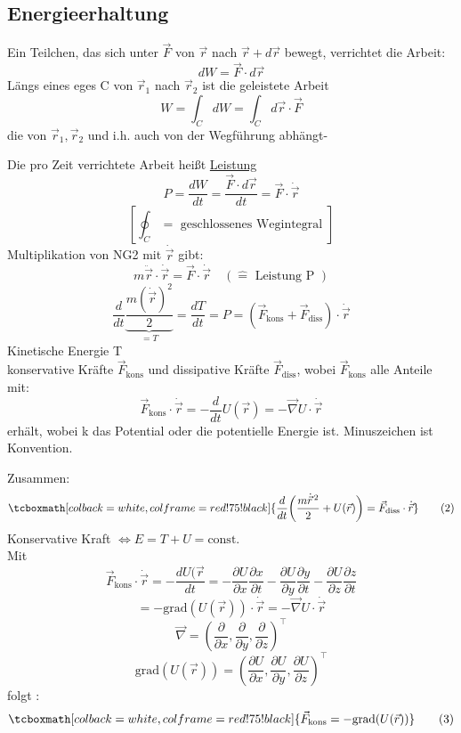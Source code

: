 \documentclass[titlepage,12pt,a4paper,ngerman]{report}
\newcommand{\tx}[1]{\textrm{#1}}
\newcommand{\ub}[1]{\underbrace{#1}}
\newcommand{\grad}{\tx{grad}}
\newcommand{\rmbox}[1]{\tcboxmath[colback=white,colframe=red!75!black]{#1}} %
\renewcommand{\boxed}{\rmbox}
\begin{document}
{\subsection{Energieerhaltung}
Ein Teilchen, das sich unter $\vec{F}$ von $\vec{r}$ nach $\vec{r} + d\vec{r}$ bewegt, verrichtet die Arbeit:
$$ dW = \vec{F} \cdot d \vec{r}$$
Längs eines eges C von $\vec{r}_{1}$ nach $\vec{r}_{2}$ ist die geleistete Arbeit
$$W = \int_C dW = \int_C d\vec{r}\cdot \vec{F}$$
die von $\vec{r}_1, \vec{r}_2$ und i.h. auch von der Wegführung abhängt-\par
Die pro Zeit verrichtete Arbeit heißt \underline{Leistung} 
$$ P = \frac{dW}{dt} = \frac{\vec{F}\cdot d \vec{r}}{dt} = \vec{F}\cdot \dot{\vec{r}}$$
$$[\oint_C = \textrm{ geschlossenes Wegintegral }]$$
Multiplikation von NG2 mit $\dot{\vec{r}}$ gibt:
$$ m\ddot{\vec{r}} \cdot \dot{\vec{r}} =\vec{F} \cdot \dot{\vec{r}} \quad ( \widehat{=} \tx{ Leistung P })$$
$$\frac{d}{dt} \ub{\frac{m(\dot{\vec{r}})^2}{2}}_{=T} = \frac{dT}{dt} = P = (\vec{F}_{\tx{kons}} + \vec{F}_{\tx{diss}}) \cdot \dot{\vec{r}} $$
Kinetische Energie T\\
konservative Kräfte $\vec{F}_{\tx{kons}}$ und dissipative Kräfte $\vec{F}_{\tx{diss}}$, wobei $\vec{F}_{\tx{kons}}$ alle Anteile mit:
$$\vec{F}_{\tx{kons}} \cdot \dot{\vec{r}} = - \frac{d}{dt} U(\vec{r}) = - \vec{\nabla} U \cdot \dot{\vec{r}}$$
erhält, wobei k das Potential oder die potentielle Energie ist.
Minuszeichen ist Konvention.\par
Zusammen:
\begin{equation*}
\boxed{\frac{d}{dt} \bigg( \frac{m \dot{\vec{r}}^{\,2}}{2} + U(\vec{r})\bigg)= \vec{F}_{\tx{diss}}
	\cdot \dot{\vec{r}}} \tag{2}
\end{equation*}
Konservative Kraft $\Leftrightarrow E = T+U=\tx{const.}$\\
Mit 
$$ \vec{F}_{\tx{kons}} \cdot \dot{\vec{r}} = - \frac{dU(\vec{r}}{dt} = -\frac{\partial U}{\partial x}\frac{\partial x}{\partial t} - \frac{\partial U}{\partial y}\frac{\partial y }{\partial t} - \frac{\partial U}{\partial z} \frac{\partial z }{\partial t}$$
$$ = - \grad(U(\vec{r})) \cdot  \dot{\vec{r}} = - \vec{\nabla} U \cdot \dot{\vec{r}}$$
$$ \vec{\nabla} = ( \frac{\partial }{\partial x}, \frac{\partial }{\partial y}, \frac{\partial }{\partial z}) ^\top$$
$$ \grad(U(\vec{r})) = ( \frac{\partial U}{\partial x}, \frac{\partial U}{\partial y}, \frac{\partial U}{\partial z}) ^\top$$
folgt :
\begin{equation*}
\boxed{\vec{F}_{\tx{kons}} = - \grad(U(\vec{r}))} \tag{3}
\end{equation*}

}
\end{document}
